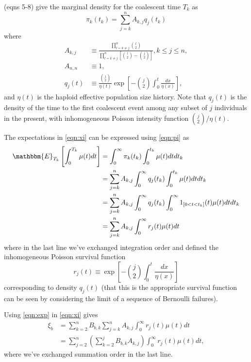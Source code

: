 \cite{Polanski2003-kg} (eqns 5-8) give the marginal density for the coalescent time $T_k$ as
\begin{equation}
\label{eqn:pi}
\pi_k(t_k) = \sum_{j=k}^n A_{k,j} q_j(t_k)
\end{equation}
where
\begin{align*}
A_{k,j} &\equiv \frac{\prod_{l=k\ne j}^{n}\binom{l}{2}}{\prod_{l=k\ne j}^{n}\left[\binom{l}{2}-\binom{j}{2}\right]}, k\le j\le n,\\
A_{n,n} &\equiv 1,\\
q_j(t) &\equiv \frac{\binom{j}{2}}{\eta(t)}\exp\left[-\binom{j}{2}\int_0^t\frac{dx}{\eta(x)}\right],
\end{align*}
and $\eta(t)$ is the haploid effective population size history.
Note that $q_j(t)$ is the density of the time to the first coalescent event among any subset of $j$ individuals in the present, with inhomogeneous Poisson intensity function $\binom{j}{2}/\eta(t)$.

The expectations in \eqref{eqn:xi} can be expressed using \eqref{eqn:pi} as
\begin{align}
\label{eqn:exp}
\mathbbm{E}_{T_k}\left[\int_0^{T_k}\mu(t)dt\right] &= \int_0^\infty\pi_k(t_k)\int_0^{t_k}\mu(t)dt dt_k\nonumber\\
&= \sum_{j=k}^n A_{k,j}\int_0^\infty q_j(t_k)\int_0^{t_k}\mu(t)dt dt_k\nonumber\\
&= \sum_{j=k}^n A_{k,j}\int_0^\infty q_j(t_k)\int_0^\infty 1_{[0<t<t_k]}(t)\mu(t)dt dt_k\nonumber\\
&= \sum_{j=k}^n A_{k,j}\int_0^\infty r_j(t)\mu(t)dt
\end{align}
where in the last line we've exchanged integration order and defined the inhomogeneous Poisson survival function
\begin{equation}
\label{eqn:r}
r_j(t) \equiv \exp\left[-\binom{j}{2}\int_0^t\frac{dx}{\eta(x)}\right]
\end{equation}
corresponding to density $q_j(t)$ (that this is the appropriate survival function can be seen by considering the limit of a sequence of Bernoulli failures).

Using \eqref{eqn:exp} in \eqref{eqn:xi} gives
\begin{align}
\label{eqn:xi2}
\xi_b &= \sum_{k=2}^n B_{b,k} \sum_{j=k}^n A_{k,j}\int_0^\infty r_j(t)\mu(t)dt\nonumber\\
&= \sum_{j=2}^n \left(\sum_{k=2}^j B_{b,k} A_{k,j}\right) \int_0^\infty r_j(t)\mu(t)dt,
\end{align}
where we've exchanged summation order in the last line.

